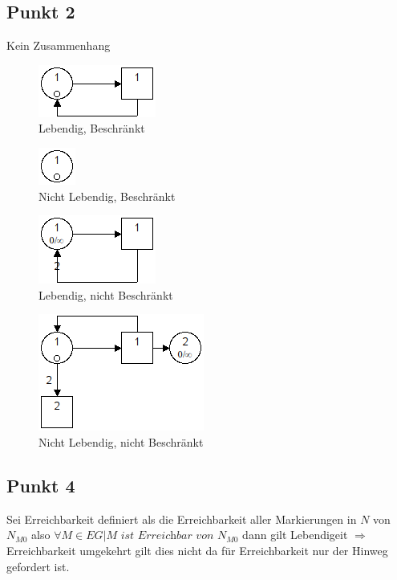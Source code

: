 \documentclass[10pt]{scrartcl}
\begin{document}
	\subsection{Punkt 2}
	Kein Zusammenhang
				\begin{figure}[H]
    				\centering	
					\includegraphics[scale=0.5]{aufg021.png}		
            		\caption{Lebendig, Beschränkt}
				\end{figure}
				\begin{figure}[H]
    				\centering	
					\includegraphics[scale=0.5]{aufg022.png}		
            		\caption{Nicht Lebendig, Beschränkt}
				\end{figure}
				\begin{figure}[H]
    				\centering	
					\includegraphics[scale=0.5]{aufg023.png}		
            		\caption{Lebendig, nicht Beschränkt}
				\end{figure}
				\begin{figure}[H]
    				\centering	
					\includegraphics[scale=0.5]{aufg024.png}		
            		\caption{Nicht Lebendig, nicht Beschränkt}
				\end{figure}

		\subsection{Punkt 4}
		Sei Erreichbarkeit definiert als die Erreichbarkeit aller Markierungen in $N$ von $N_{M0}$ also $\forall M \in EG | M \textit{ ist Erreichbar von } N_{M0}$ dann gilt Lebendigeit $\Longrightarrow$ Erreichbarkeit umgekehrt gilt dies nicht da für Erreichbarkeit nur der Hinweg gefordert ist.
		
\end{document}
